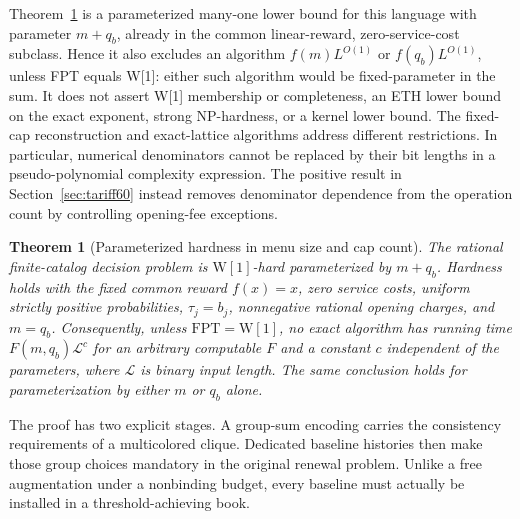 \documentclass[11pt,letterpaper]{article}
\newtheorem{theorem}{Theorem}[section]
\theoremstyle{definition}\newtheorem{remark}[theorem]{Remark}
\begin{document}
Theorem~\ref{thm:wone59} is a parameterized many-one lower bound for this language with parameter $m+q_b$, already in the common linear-reward, zero-service-cost subclass. Hence it also excludes an algorithm $f(m)L^{O(1)}$ or $f(q_b)L^{O(1)}$, unless FPT equals W[1]: either such algorithm would be fixed-parameter in the sum. It does not assert W[1] membership or completeness, an ETH lower bound on the exact exponent, strong NP-hardness, or a kernel lower bound. The fixed-cap reconstruction and exact-lattice algorithms address different restrictions. In particular, numerical denominators cannot be replaced by their bit lengths in a pseudo-polynomial complexity expression. The positive result in Section~\ref{sec:tariff60} instead removes denominator dependence from the operation count by controlling opening-fee exceptions.
\begin{theorem}[Parameterized hardness in menu size and cap count]\label{thm:wone59}
The rational finite-catalog decision problem is $\mathrm{W}[1]$-hard parameterized by $m+q_b$. Hardness holds with the fixed common reward $f(x)=x$, zero service costs, uniform strictly positive probabilities, $\tau_j=b_j$, nonnegative rational opening charges, and $m=q_b$. Consequently, unless $\mathrm{FPT}=\mathrm{W}[1]$, no exact algorithm has running time $F(m,q_b)\mathcal L^c$ for an arbitrary computable $F$ and a constant $c$ independent of the parameters, where $\mathcal L$ is binary input length. The same conclusion holds for parameterization by either $m$ or $q_b$ alone.
\end{theorem}

The proof has two explicit stages. A group-sum encoding carries the consistency requirements of a multicolored clique. Dedicated baseline histories then make those group choices mandatory in the original renewal problem. Unlike a free augmentation under a nonbinding budget, every baseline must actually be installed in a threshold-achieving book.
\end{document}

